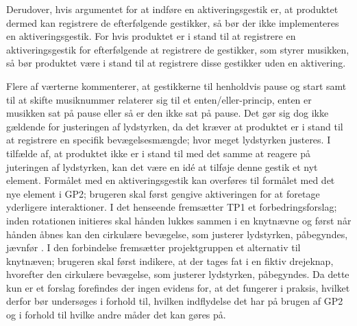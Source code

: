 Derudover, hvis argumentet for at indføre en aktiveringsgestik er, at produktet dermed kan registrere de efterfølgende gestikker, så bør der ikke implementeres en aktiveringsgestik. For hvis produktet er i stand til at registrere en aktiveringsgestik for efterfølgende at registrere de gestikker, som styrer musikken, så bør produktet være i stand til at registrere disse gestikker uden en aktivering. 

Flere af værterne kommenterer, at gestikkerne til henholdvis pause og start samt til at skifte musiknummer relaterer sig til et enten/eller-princip, enten er musikken sat på pause eller så er den ikke sat på pause. Det gør sig dog ikke gældende for justeringen af lydstyrken, da det kræver at produktet er i stand til at registrere en specifik bevægelsesmængde; hvor meget lydstyrken justeres. I tilfælde af, at produktet ikke er i stand til med det samme at reagere på juteringen af lydstyrken, kan det være en idé at tilføje denne gestik et nyt element. Formålet med en aktiveringsgestik kan overføres til formålet med det nye element i GP2; brugeren skal først gengive aktiveringen for at foretage yderligere interaktioner. I det henseende fremsætter TP1 et forbedringsforslag; inden rotationen initieres skal hånden lukkes sammen i en knytnævne og først når hånden åbnes kan den cirkulære bevægelse, som justerer lydstyrken, påbegyndes, jævnfør . I den forbindelse fremsætter projektgruppen et alternativ til knytnæven; brugeren skal først indikere, at der tages fat i en fiktiv drejeknap, hvorefter den cirkulære bevægelse, som justerer lydstyrken, påbegyndes. Da dette kun er et forslag forefindes der ingen evidens for, at det fungerer i praksis, hvilket derfor bør undersøges i forhold til, hvilken indflydelse det har på brugen af GP2 og i forhold til hvilke andre måder det kan gøres på.       


